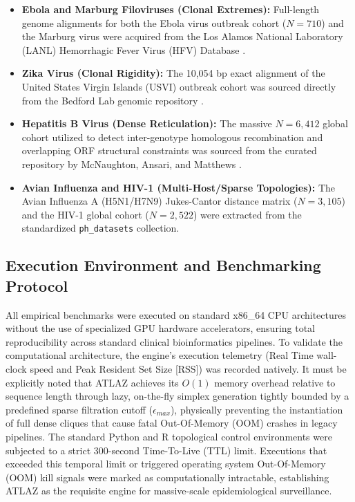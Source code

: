 \begin{itemize}
    \item \textbf{Ebola and Marburg Filoviruses (Clonal Extremes):} Full-length genome alignments for both the Ebola virus outbreak cohort ($N=710$) and the Marburg virus were acquired from the Los Alamos National Laboratory (LANL) Hemorrhagic Fever Virus (HFV) Database \citep{kuiken2012lanl}.
    \item \textbf{Zika Virus (Clonal Rigidity):} The 10,054 bp exact alignment of the United States Virgin Islands (USVI) outbreak cohort was sourced directly from the Bedford Lab genomic repository \citep{bedford2016zika}.
    \item \textbf{Hepatitis B Virus (Dense Reticulation):} The massive $N=6,412$ global cohort utilized to detect inter-genotype homologous recombination and overlapping ORF structural constraints was sourced from the curated repository by McNaughton, Ansari, and Matthews \citep{mcnaughton2019hbv}.
    \item \textbf{Avian Influenza and HIV-1 (Multi-Host/Sparse Topologies):} The Avian Influenza A (H5N1/H7N9) Jukes-Cantor distance matrix ($N=3,105$) and the HIV-1 global cohort ($N=2,522$) were extracted from the standardized \texttt{ph\_datasets} collection.
\end{itemize}

\subsection{Execution Environment and Benchmarking Protocol}
All empirical benchmarks were executed on standard x86\_64 CPU architectures without the use of specialized GPU hardware accelerators, ensuring total reproducibility across standard clinical bioinformatics pipelines. To validate the computational architecture, the engine's execution telemetry (Real Time wall-clock speed and Peak Resident Set Size [RSS]) was recorded natively. It must be explicitly noted that ATLAZ achieves its $O(1)$ memory overhead relative to sequence length through lazy, on-the-fly simplex generation tightly bounded by a predefined sparse filtration cutoff ($\epsilon_{max}$), physically preventing the instantiation of full dense cliques that cause fatal Out-Of-Memory (OOM) crashes in legacy pipelines. The standard Python and R topological control environments were subjected to a strict 300-second Time-To-Live (TTL) limit. Executions that exceeded this temporal limit or triggered operating system Out-Of-Memory (OOM) kill signals were marked as computationally intractable, establishing ATLAZ as the requisite engine for massive-scale epidemiological surveillance.

